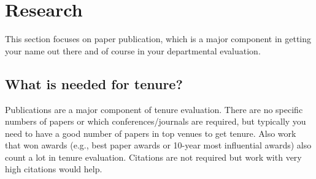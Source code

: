 \documentclass[oneside,11pt,dvipsnames]{book}
\begin{document}
\chapter{Research}
This section focuses on paper publication, which is a major component in getting your name out there and of course in your departmental evaluation.  

\section{What is needed for tenure?} 

Publications are a major component of tenure evaluation. There are no specific numbers of papers or which conferences/journals are required, but typically you need to have a good number of papers in top venues to get tenure.  Also work that won awards (e.g., best paper awards or 10-year most influential awards) also count a lot in tenure evaluation. Citations are not required but work with very high citations would help.  
















\end{document}
